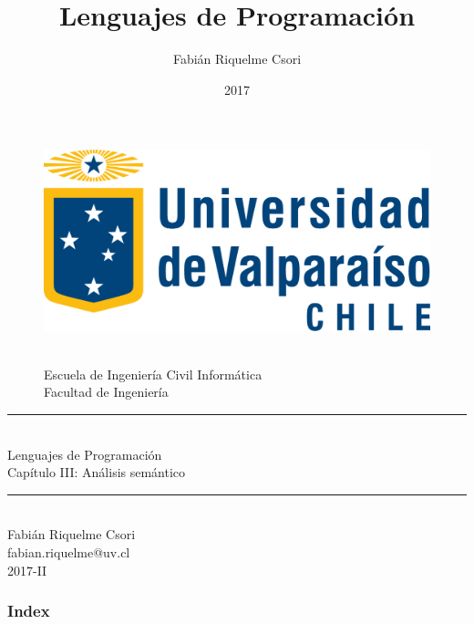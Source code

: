 \documentclass[handout]{beamer} %
\title{Lenguajes de Programación}                     %
\author{Fabián Riquelme Csori}                        %
\date{2017}                                           %
\institute{Universidad de Valparaíso}                 %
\newcommand{\HRule}{\rule{\linewidth}{0.2mm}\\[1ex]}
\begin{document}
%

\begin{frame}[plain]
  \begin{figure}[h]
    \begin{minipage}{0.3\textwidth}
    \includegraphics[width=.9\textwidth]{./image/logo-UV.png}
    \end{minipage}
    \begin{minipage}{0.65\textwidth}
     $~$\\[3.6ex]
     \footnotesize{Escuela de Ingeniería Civil Informática}\\
     \footnotesize{Facultad de Ingeniería}
    \end{minipage}
  \end{figure}
  \begin{center}
    \vspace{1ex}
    \HRule
    \Large{Lenguajes de Programación}\\{\small Capítulo III: Análisis semántico}\\[-1ex]
    \HRule\vspace{1ex}
    \large{Fabián Riquelme Csori}\\[.5ex]\footnotesize{fabian.riquelme@uv.cl}\\[6ex] {\tiny 2017-II}\\[6ex]
  \end{center}
\end{frame}

\begin{frame}
 \frametitle{Index}
 \scriptsize 			%
 \tableofcontents		%
\end{frame}
\end{document}
